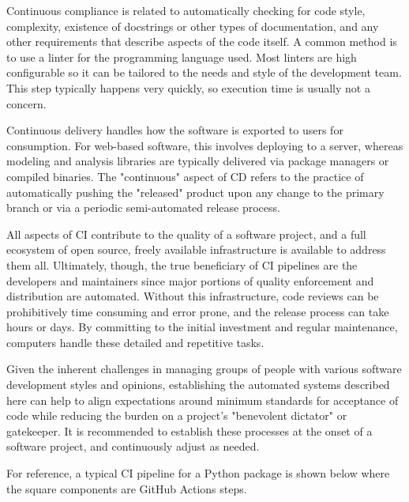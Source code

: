 \documentclass[]{nrel}
\begin{document}
Continuous compliance is related to automatically checking for code style, complexity,
existence of docstrings or other types of documentation, and any other requirements
that describe aspects of the code itself.
A common method is to use a linter for the programming language used.
Most linters are high configurable so it can be tailored to the needs and style of
the development team.
This step typically happens very quickly, so execution time is usually not a concern.

Continuous delivery handles how the software is exported to users for consumption.
For web-based software, this involves deploying to a server, whereas modeling and analysis
libraries are typically delivered via package managers or compiled binaries.
The "continuous" aspect of CD refers to the practice of automatically pushing the
"released" product upon any change to the primary branch or via a periodic semi-automated
release process.

All aspects of CI contribute to the quality of a software project, and a full ecosystem
of open source, freely available infrastructure is available to address them all.
Ultimately, though, the true beneficiary of CI pipelines are the developers and maintainers
since major portions of quality enforcement and distribution are automated.
Without this infrastructure, code reviews can be prohibitively time consuming and error prone,
and the release process can take hours or days.
By committing to the initial investment and regular maintenance, computers handle
these detailed and repetitive tasks.

Given the inherent challenges in managing groups of people with various software
development styles and opinions, establishing the automated systems described here
can help to align expectations around minimum standards for acceptance of code while
reducing the burden on a project's "benevolent dictator" or gatekeeper.
It is recommended to establish these processes at the onset of a software project, and
continuously adjust as needed.

For reference, a typical CI pipeline for a Python package is shown below where the square
components are GitHub Actions steps.



\end{document}

